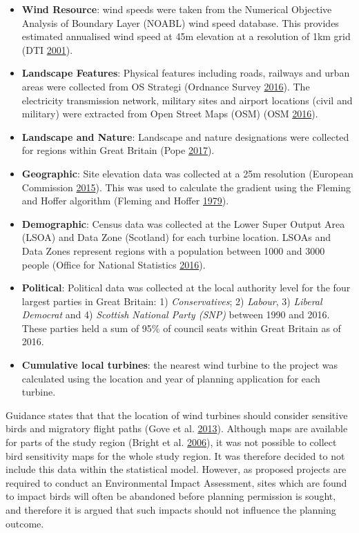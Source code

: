 \documentclass[a4paper,]{article}
\providecommand{\tightlist}{%
  \setlength{\itemsep}{0pt}\setlength{\parskip}{0pt}}
\theoremstyle{definition}
\theoremstyle{definition}
\theoremstyle{definition}
\theoremstyle{remark}
\begin{document}
\begin{itemize}
\tightlist
\item
  \textbf{Wind Resource}: wind speeds were taken from the Numerical
  Objective Analysis of Boundary Layer (NOABL) wind speed database. This
  provides estimated annualised wind speed at 45m elevation at a
  resolution of 1km grid (DTI \protect\hyperlink{ref-DTI2001}{2001}).
\item
  \textbf{Landscape Features}: Physical features including roads,
  railways and urban areas were collected from OS Strategi (Ordnance
  Survey \protect\hyperlink{ref-Survey2016}{2016}). The electricity
  transmission network, military sites and airport locations (civil and
  military) were extracted from Open Street Maps (OSM) (OSM
  \protect\hyperlink{ref-Overpass2016}{2016}).
\item
  \textbf{Landscape and Nature}: Landscape and nature designations were
  collected for regions within Great Britain (Pope
  \protect\hyperlink{ref-Pope2017}{2017}).
\item
  \textbf{Geographic}: Site elevation data was collected at a 25m
  resolution (European Commission
  \protect\hyperlink{ref-Commission2015}{2015}). This was used to
  calculate the gradient using the Fleming and Hoffer algorithm (Fleming
  and Hoffer \protect\hyperlink{ref-Fleming1979}{1979}).
\item
  \textbf{Demographic}: Census data was collected at the Lower Super
  Output Area (LSOA) and Data Zone (Scotland) for each turbine location.
  LSOAs and Data Zones represent regions with a population between 1000
  and 3000 people (Office for National Statistics
  \protect\hyperlink{ref-OfficeforNationalStatistics}{2016}).\\
\item
  \textbf{Political}: Political data was collected at the local
  authority level for the four largest parties in Great Britain: 1)
  \emph{Conservatives}; 2) \emph{Labour}, 3) \emph{Liberal Democrat} and
  4) \emph{Scottish National Party (SNP)} between 1990 and 2016. These
  parties held a sum of 95\% of council seats within Great Britain as of
  2016.
\item
  \textbf{Cumulative local turbines}: the nearest wind turbine to the
  project was calculated using the location and year of planning
  application for each turbine.
\end{itemize}

Guidance states that that the location of wind turbines should consider
sensitive birds and migratory flight paths (Gove et al.
\protect\hyperlink{ref-Gove2013}{2013}). Although maps are available for
parts of the study region (Bright et al.
\protect\hyperlink{ref-Bright2006}{2006}), it was not possible to
collect bird sensitivity maps for the whole study region. It was
therefore decided to not include this data within the statistical model.
However, as proposed projects are required to conduct an Environmental
Impact Assessment, sites which are found to impact birds will often be
abandoned before planning permission is sought, and therefore it is
argued that such impacts should not influence the planning outcome.
\end{document}
